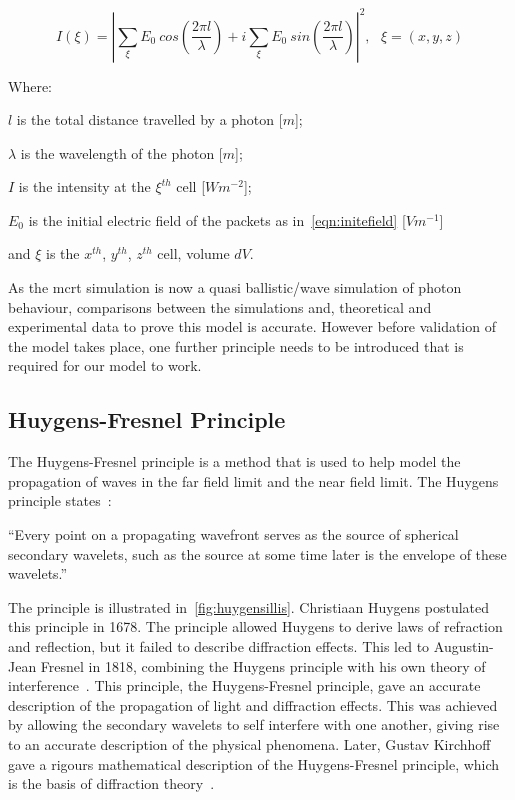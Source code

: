 \begin{equation}
I(\xi)= \left| \sum\limits_{\xi}E_0\ cos\left(\frac{2\pi l}{\lambda}\right) + i \sum\limits_{\xi}E_0\ sin\left(\frac{2\pi l}{\lambda}\right)\right|^2,\ \ \ \xi=(x,y,z)
\label{eqn:intense}
\end{equation}

\noindent Where:

\indent $l$ is the total distance travelled by a photon [$m$];

\indent $\lambda$ is the wavelength of the photon [$m$];

\indent $I$ is the intensity at the $\xi^{th}$ cell [$W m^{-2}$];

\indent $E_0$ is the initial electric field of the packets as in~\cref{eqn:initefield} [$Vm^{-1}$]

\indent and $\xi$ is the $x^{th}$, $y^{th}$, $z^{th}$ cell, volume $dV$.

\medskip

As the \gls*{mcrt} simulation is now a quasi ballistic/wave simulation of photon behaviour, comparisons between the simulations and, theoretical and experimental data to prove this model is accurate. However before validation of the model takes place, one further principle needs to be introduced that is required for our model to work.

\subsection{Huygens-Fresnel Principle}

The Huygens-Fresnel principle is a method that is used to help model the propagation of waves in the far field limit and the near field limit. 
The Huygens principle states~\cite{huygens2012treatise,hecht2017optics,huygens1900wave}: 

\medskip

``Every point on a propagating wavefront serves as the source of spherical secondary wavelets, such as the source at some time later is the envelope of these wavelets.''

\medskip

The principle is illustrated in~\cref{fig:huygensillis}. Christiaan Huygens postulated this principle in 1678.
The principle allowed Huygens to derive laws of refraction and reflection, but it failed to describe diffraction effects.
This led to Augustin-Jean Fresnel in 1818, combining the Huygens principle with his own theory of interference~\cite{fresnel1819memoire,huygens1900wave}.
This principle, the Huygens-Fresnel principle, gave an accurate description of the propagation of light and diffraction effects.
This was achieved by allowing the secondary wavelets to self interfere with one another, giving rise to an accurate description of the physical phenomena.
Later, Gustav Kirchhoff gave a rigours mathematical description of the Huygens-Fresnel principle, which is the basis of diffraction theory~\cite{kirchhoff1883ann,born2000principles}. 

